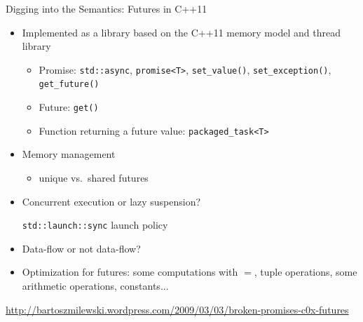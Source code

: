 \documentclass[xcolor=dvipsnames,9pt,mathserif]{beamer}
\begin{document}
\begin{frame}{Digging into the Semantics: Futures in C++11}
  \begin{itemize}
  \item Implemented as a library based on the C++11 memory model and
    thread library
    \begin{itemize}
    \item Promise: \texttt{std::async}, \texttt{promise<T>},
      \texttt{set\_value()}, \texttt{set\_exception()}, \texttt{get\_future()}
    \item Future: \texttt{get()}
    \item Function returning a future value: \texttt{packaged\_task<T>}
    \end{itemize}
  \item Memory management
    \begin{itemize}
    \item unique vs.\ shared futures
    \end{itemize}
  \item Concurrent execution or lazy suspension?
    
    \texttt{std::launch::sync} launch policy
  \item Data-flow or not data-flow?
  \item Optimization for futures: some computations with $=$, tuple
    operations, some arithmetic operations, constants...
  \end{itemize}
  
  \small
  \url{http://bartoszmilewski.wordpress.com/2009/03/03/broken-promises-c0x-futures}
\end{frame}
\end{document}
